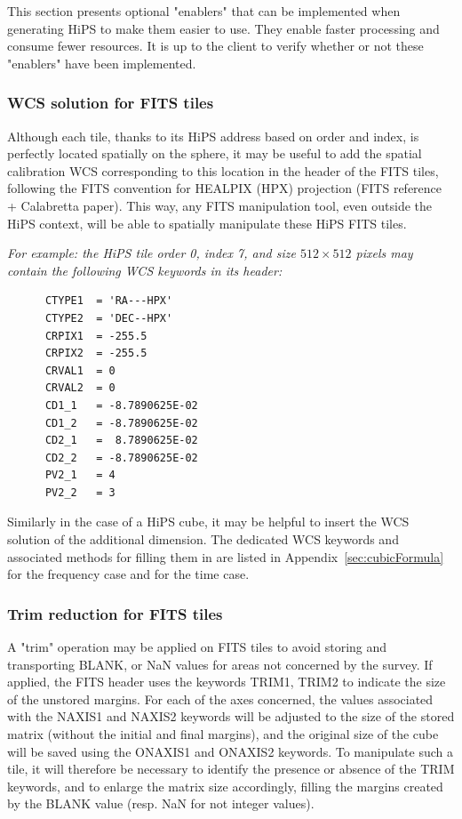 \documentclass[11pt,a4paper]{ivoa}
\begin{document}
This section presents optional "enablers" that can be implemented when generating HiPS to make them easier to use. They enable faster processing and consume fewer resources. It is up to the client to verify whether or not these "enablers" have been implemented.

\subsubsection{WCS solution for FITS tiles}
\label{sec:WCS}

Although each tile, thanks to its HiPS address based on order and index, is perfectly located spatially on the sphere, it may be useful to add the spatial calibration WCS corresponding to this location in the header of the FITS tiles, following the FITS convention for HEALPIX (HPX) projection (FITS reference + Calabretta paper). This way, any FITS manipulation tool, even outside the HiPS context, will be able to spatially manipulate these HiPS FITS tiles.

\medskip
\noindent\textit{For example: the HiPS tile order 0, index 7, and size $512 \times 512$ pixels may contain the following WCS keywords in its header:}
\begin{verbatim}
      CTYPE1  = 'RA---HPX'
      CTYPE2  = 'DEC--HPX'
      CRPIX1  = -255.5
      CRPIX2  = -255.5
      CRVAL1  = 0
      CRVAL2  = 0
      CD1_1   = -8.7890625E-02
      CD1_2   = -8.7890625E-02
      CD2_1   =  8.7890625E-02
      CD2_2   = -8.7890625E-02
      PV2_1   = 4
      PV2_2   = 3
\end{verbatim}
\medskip

Similarly in the case of a HiPS cube, it may be helpful to insert the WCS solution of the additional dimension. The dedicated WCS keywords and associated methods for filling them in are listed in Appendix~\ref{sec:cubicFormula} for the frequency case and for the time case.

\subsubsection{Trim reduction for FITS tiles}

A "trim" operation may be applied on FITS tiles to avoid storing and transporting BLANK, or NaN values for areas not concerned by the survey. If applied, the FITS header uses the keywords TRIM1, TRIM2 to indicate the size of the unstored margins. For each of the axes concerned, the values associated with the NAXIS1 and NAXIS2 keywords will be adjusted to the size of the stored matrix (without the initial and final margins), and the original size of the cube will be saved using the ONAXIS1 and ONAXIS2 keywords. To manipulate such a tile, it will therefore be necessary to identify the presence or absence of the TRIM keywords, and to enlarge the matrix size accordingly, filling the margins created by the BLANK value (resp. NaN for not integer values). 
\end{document}
